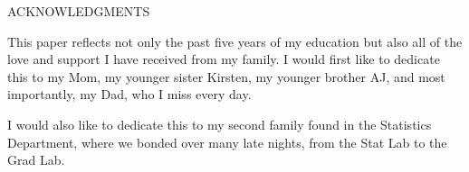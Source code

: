\begin{center}
ACKNOWLEDGMENTS
\end{center}

This paper reflects not only the past five years of my education but
also all of the love and support I have received from my family. I would first 
like to dedicate this to my Mom, my younger sister Kirsten, my younger brother AJ, 
and most importantly, my Dad, who I miss every day.

I would also like to dedicate this to my second family found in the Statistics Department,
where we bonded over many late nights, from the Stat Lab to the Grad Lab.

\clearpage
